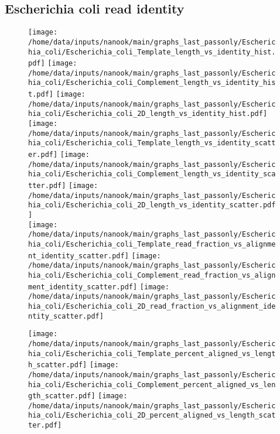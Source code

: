 \documentclass[a4paper,11pt,oneside]{article}
\begin{document}
\subsection*{Escherichia coli read identity}
\vspace{-3mm}
\begin{figure}[H]
\centering
\texttt{[image: /home/data/inputs/nanook/main/graphs\_last\_passonly/Escherichia\_coli/Escherichia\_coli\_Template\_length\_vs\_identity\_hist.pdf]}
\texttt{[image: /home/data/inputs/nanook/main/graphs\_last\_passonly/Escherichia\_coli/Escherichia\_coli\_Complement\_length\_vs\_identity\_hist.pdf]}
\texttt{[image: /home/data/inputs/nanook/main/graphs\_last\_passonly/Escherichia\_coli/Escherichia\_coli\_2D\_length\_vs\_identity\_hist.pdf]} \\
\texttt{[image: /home/data/inputs/nanook/main/graphs\_last\_passonly/Escherichia\_coli/Escherichia\_coli\_Template\_length\_vs\_identity\_scatter.pdf]}
\texttt{[image: /home/data/inputs/nanook/main/graphs\_last\_passonly/Escherichia\_coli/Escherichia\_coli\_Complement\_length\_vs\_identity\_scatter.pdf]}
\texttt{[image: /home/data/inputs/nanook/main/graphs\_last\_passonly/Escherichia\_coli/Escherichia\_coli\_2D\_length\_vs\_identity\_scatter.pdf]} \\
\texttt{[image: /home/data/inputs/nanook/main/graphs\_last\_passonly/Escherichia\_coli/Escherichia\_coli\_Template\_read\_fraction\_vs\_alignment\_identity\_scatter.pdf]}
\texttt{[image: /home/data/inputs/nanook/main/graphs\_last\_passonly/Escherichia\_coli/Escherichia\_coli\_Complement\_read\_fraction\_vs\_alignment\_identity\_scatter.pdf]}
\texttt{[image: /home/data/inputs/nanook/main/graphs\_last\_passonly/Escherichia\_coli/Escherichia\_coli\_2D\_read\_fraction\_vs\_alignment\_identity\_scatter.pdf]}
\end{figure}
\begin{figure}[H]
\centering
\texttt{[image: /home/data/inputs/nanook/main/graphs\_last\_passonly/Escherichia\_coli/Escherichia\_coli\_Template\_percent\_aligned\_vs\_length\_scatter.pdf]}
\texttt{[image: /home/data/inputs/nanook/main/graphs\_last\_passonly/Escherichia\_coli/Escherichia\_coli\_Complement\_percent\_aligned\_vs\_length\_scatter.pdf]}
\texttt{[image: /home/data/inputs/nanook/main/graphs\_last\_passonly/Escherichia\_coli/Escherichia\_coli\_2D\_percent\_aligned\_vs\_length\_scatter.pdf]}
\end{figure}
\end{document}
